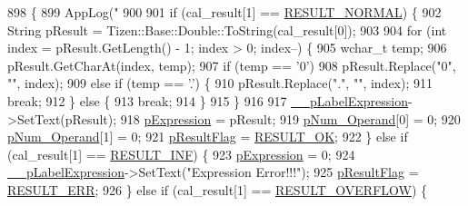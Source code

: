 \begin{DoxyCode}
898                                                   \{
899     AppLog(\textcolor{stringliteral}{"%
900 
901     \textcolor{keywordflow}{if} (cal\_result[1] == \hyperlink{_calculator_form_8cpp_a7df345a79a590f6ca3976c4cca33d866}{RESULT\_NORMAL}) \{
902         String pResult = Tizen::Base::Double::ToString(cal\_result[0]);
903 
904         \textcolor{keywordflow}{for} (\textcolor{keywordtype}{int} index = pResult.GetLength() - 1; index > 0; index--) \{
905             \textcolor{keywordtype}{wchar\_t} temp;
906             pResult.GetCharAt(index, temp);
907             \textcolor{keywordflow}{if} (temp == \textcolor{charliteral}{'0'})
908                 pResult.Replace(\textcolor{stringliteral}{"0"}, \textcolor{stringliteral}{""}, index);
909             \textcolor{keywordflow}{else} \textcolor{keywordflow}{if} (temp == \textcolor{charliteral}{'.'}) \{
910                 pResult.Replace(\textcolor{stringliteral}{"."}, \textcolor{stringliteral}{""}, index);
911                 \textcolor{keywordflow}{break};
912             \} \textcolor{keywordflow}{else} \{
913                 \textcolor{keywordflow}{break};
914             \}
915         \}
916 
917         \hyperlink{class_calculator_form_a85c791f34a8b69e7d22b7d64d7f69bac}{\_\_pLabelExpression}->SetText(pResult);
918         \hyperlink{_calculator_form_8cpp_a8e641e0c730e6831fcb8e9caf57f5285}{pExpression} = pResult;
919         \hyperlink{_calculator_form_8cpp_a564e048fb0774fad296f0ce77b108d23}{pNum\_Operand}[0] = 0;
920         \hyperlink{_calculator_form_8cpp_a564e048fb0774fad296f0ce77b108d23}{pNum\_Operand}[1] = 0;
921         \hyperlink{_calculator_form_8cpp_a710068ff7294670ef87617fd3e379c41}{pResultFlag} = \hyperlink{_calculator_form_8cpp_ad415544fff20c80892fa7e5555722776}{RESULT\_OK};
922     \} \textcolor{keywordflow}{else} \textcolor{keywordflow}{if} (cal\_result[1] == \hyperlink{_calculator_form_8cpp_a4e8ad5244efbb3d9d9904a8a9234f87d}{RESULT\_INF}) \{
923         \hyperlink{_calculator_form_8cpp_a8e641e0c730e6831fcb8e9caf57f5285}{pExpression} = 0;
924         \hyperlink{class_calculator_form_a85c791f34a8b69e7d22b7d64d7f69bac}{\_\_pLabelExpression}->SetText(\textcolor{stringliteral}{"Expression Error!!!"});
925         \hyperlink{_calculator_form_8cpp_a710068ff7294670ef87617fd3e379c41}{pResultFlag} = \hyperlink{_calculator_form_8cpp_ae7b7d386a4346e31a05841a90ca2067d}{RESULT\_ERR};
926     \} \textcolor{keywordflow}{else} \textcolor{keywordflow}{if} (cal\_result[1] == \hyperlink{_calculator_form_8cpp_a113621396df65ce36c6b41262ff2f884}{RESULT\_OVERFLOW}) \{
}
\end{DoxyCode}
